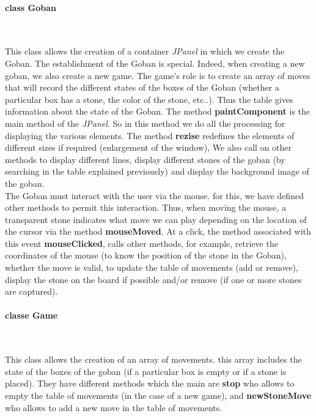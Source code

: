 \documentclass[a4paper,10pt,twoside]{report}
\begin{document}
	\paragraph{class Goban}
	~~\vspace{2mm}

	This class allows the creation of a container \emph{JPanel} in which we create the Goban. The establishment of the Goban is special. Indeed, when creating a new goban, we also create a new game. The game's role is to create an array of moves that will record the different states of the boxes of the Goban (whether a particular box has a stone, the color of the stone, etc..). Thus the table gives information about the state of the Goban. The method \textbf{paintComponent} is the main method of the \emph{JPanel}. So in this method we do all the processing for displaying the various elements. The method \textbf{rezise} redefines the elements of different sizes if required (enlargement of the window), We also call on other methods to display different lines, display different stones of the goban (by searching in the table explained previously) and display the background image of the goban.\\

	The Goban must interact with the user via the mouse. for this, we have defined other methods to permit this interaction. Thus, when moving the mouse, a transparent stone indicates what move we can play depending on the location of the cursor via the method \textbf{mouseMoved}. At a click, the method associated with this event \textbf{mouseClicked}, calls other methods, for example, retrieve the coordinates of the mouse (to know the position of the stone in the Goban), whether the move is valid, to update the table of movements (add or remove), display the stone on the board if possible and/or remove (if one or more stones are captured).


	\paragraph{classe Game}
	~~\vspace{2mm}

	This class allows the creation of an array of movements. this array includes the state of the boxes of the goban (if a particular box is empty or if a stone is placed). They have different methods which  the main are \textbf{stop} who allows to empty the table of movements (in the case of a new game), and \textbf{newStoneMove} who allows to add a new move in the table of movements. 
\end{document}
